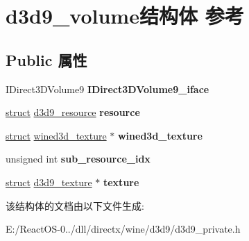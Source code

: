 \hypertarget{structd3d9__volume}{}\section{d3d9\+\_\+volume结构体 参考}
\label{structd3d9__volume}
\subsection*{Public 属性}
\begin{DoxyCompactItemize}
\item 
\mbox{\label{structd3d9__volume_a064e8e96aca314d96e191939adb96bc5}} 
I\+Direct3\+D\+Volume9 {\bfseries I\+Direct3\+D\+Volume9\+\_\+iface}
\item 
\mbox{\label{structd3d9__volume_a7d207a9b5427a8fc9f4b2a1f5e8ea3f2}} 
\hyperlink{interfacestruct}{struct} \hyperlink{structd3d9__resource}{d3d9\+\_\+resource} {\bfseries resource}
\item 
\mbox{\label{structd3d9__volume_a3fcd12dd639d3df2fbcb59e569ec76ec}} 
\hyperlink{interfacestruct}{struct} \hyperlink{structwined3d__texture}{wined3d\+\_\+texture} $\ast$ {\bfseries wined3d\+\_\+texture}
\item 
\mbox{\label{structd3d9__volume_a119e47ba5d4c4be8d2b2f2329cea7928}} 
unsigned int {\bfseries sub\+\_\+resource\+\_\+idx}
\item 
\mbox{\label{structd3d9__volume_a599c962b6cae0b5485f1f5b63a8e2f56}} 
\hyperlink{interfacestruct}{struct} \hyperlink{structd3d9__texture}{d3d9\+\_\+texture} $\ast$ {\bfseries texture}
\end{DoxyCompactItemize}


该结构体的文档由以下文件生成\+:\begin{DoxyCompactItemize}
\item 
E\+:/\+React\+O\+S-\/0../dll/directx/wine/d3d9/d3d9\+\_\+private.\+h\end{DoxyCompactItemize}
